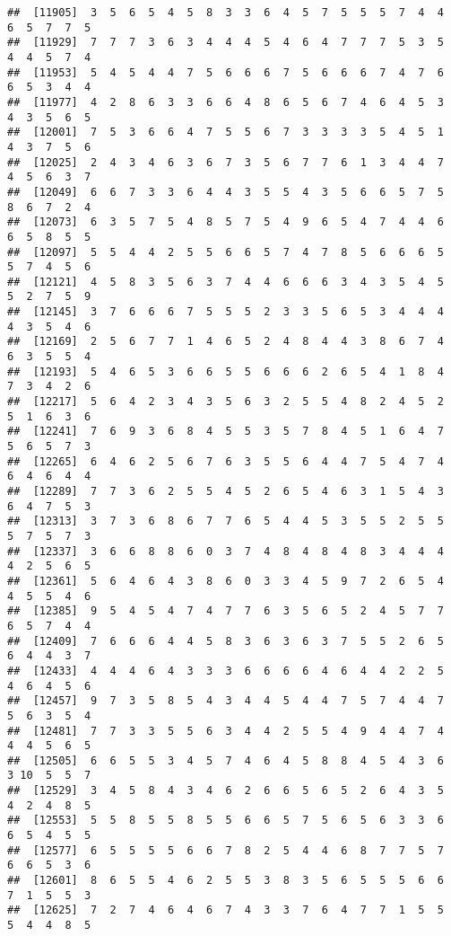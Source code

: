 \documentclass[
]{book}
\begin{document}
\begin{verbatim}
##  [11905]  3  5  6  5  4  5  8  3  3  6  4  5  7  5  5  5  7  4  4  6  5  7  7  5
##  [11929]  7  7  7  3  6  3  4  4  4  5  4  6  4  7  7  7  5  3  5  4  4  5  7  4
##  [11953]  5  4  5  4  4  7  5  6  6  6  7  5  6  6  6  7  4  7  6  6  5  3  4  4
##  [11977]  4  2  8  6  3  3  6  6  4  8  6  5  6  7  4  6  4  5  3  4  3  5  6  5
##  [12001]  7  5  3  6  6  4  7  5  5  6  7  3  3  3  3  5  4  5  1  4  3  7  5  6
##  [12025]  2  4  3  4  6  3  6  7  3  5  6  7  7  6  1  3  4  4  7  4  5  6  3  7
##  [12049]  6  6  7  3  3  6  4  4  3  5  5  4  3  5  6  6  5  7  5  8  6  7  2  4
##  [12073]  6  3  5  7  5  4  8  5  7  5  4  9  6  5  4  7  4  4  6  6  5  8  5  5
##  [12097]  5  5  4  4  2  5  5  6  6  5  7  4  7  8  5  6  6  6  5  5  7  4  5  6
##  [12121]  4  5  8  3  5  6  3  7  4  4  6  6  6  3  4  3  5  4  5  5  2  7  5  9
##  [12145]  3  7  6  6  6  7  5  5  5  2  3  3  5  6  5  3  4  4  4  4  3  5  4  6
##  [12169]  2  5  6  7  7  1  4  6  5  2  4  8  4  4  3  8  6  7  4  6  3  5  5  4
##  [12193]  5  4  6  5  3  6  6  5  5  6  6  6  2  6  5  4  1  8  4  7  3  4  2  6
##  [12217]  5  6  4  2  3  4  3  5  6  3  2  5  5  4  8  2  4  5  2  5  1  6  3  6
##  [12241]  7  6  9  3  6  8  4  5  5  3  5  7  8  4  5  1  6  4  7  5  6  5  7  3
##  [12265]  6  4  6  2  5  6  7  6  3  5  5  6  4  4  7  5  4  7  4  6  4  6  4  4
##  [12289]  7  7  3  6  2  5  5  4  5  2  6  5  4  6  3  1  5  4  3  6  4  7  5  3
##  [12313]  3  7  3  6  8  6  7  7  6  5  4  4  5  3  5  5  2  5  5  5  7  5  7  3
##  [12337]  3  6  6  8  8  6  0  3  7  4  8  4  8  4  8  3  4  4  4  4  2  5  6  5
##  [12361]  5  6  4  6  4  3  8  6  0  3  3  4  5  9  7  2  6  5  4  4  5  5  4  6
##  [12385]  9  5  4  5  4  7  4  7  7  6  3  5  6  5  2  4  5  7  7  6  5  7  4  4
##  [12409]  7  6  6  6  4  4  5  8  3  6  3  6  3  7  5  5  2  6  5  6  4  4  3  7
##  [12433]  4  4  4  6  4  3  3  3  6  6  6  6  4  6  4  4  2  2  5  4  6  4  5  6
##  [12457]  9  7  3  5  8  5  4  3  4  4  5  4  4  7  5  7  4  4  7  5  6  3  5  4
##  [12481]  7  7  3  3  5  5  6  3  4  4  2  5  5  4  9  4  4  7  4  4  4  5  6  5
##  [12505]  6  6  5  5  3  4  5  7  4  6  4  5  8  8  4  5  4  3  6  3 10  5  5  7
##  [12529]  3  4  5  8  4  3  4  6  2  6  6  5  6  5  2  6  4  3  5  4  2  4  8  5
##  [12553]  5  5  8  5  5  8  5  5  6  6  5  7  5  6  5  6  3  3  6  6  5  4  5  5
##  [12577]  6  5  5  5  5  6  6  7  8  2  5  4  4  6  8  7  7  5  7  6  6  5  3  6
##  [12601]  8  6  5  5  4  6  2  5  5  3  8  3  5  6  5  5  5  6  6  7  1  5  5  3
##  [12625]  7  2  7  4  6  4  6  7  4  3  3  7  6  4  7  7  1  5  5  5  4  4  8  5

\end{verbatim}
\end{document}
